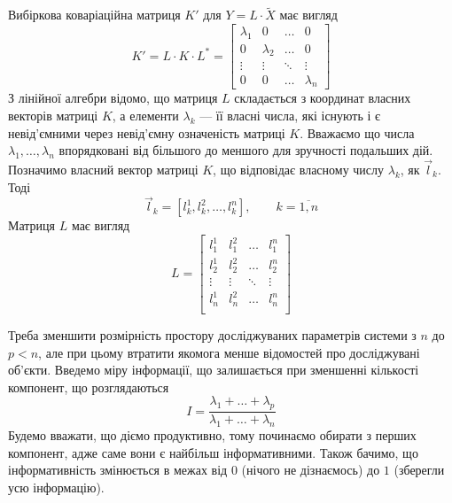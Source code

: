 Вибіркова коваріаційна матриця $K'$ для $Y = L \cdot \tilde{X}$ має вигляд
\begin{equation*}
  K'
  = L \cdot K \cdot L^*
  = \begin{bmatrix}
    \lambda_1 & 0         & \dots  & 0      \\
    0         & \lambda_2 & \dots  & 0      \\
    \vdots    & \vdots    & \ddots & \vdots \\
    0         & 0         & \dots  & \lambda_n
  \end{bmatrix}
\end{equation*}
З лінійної алгебри відомо, що матриця $L$ складається з координат власних
векторів матриці $K$, а елементи $\lambda_k$ --- її власні числа, які
існують і є невід’ємними через невід’ємну означеність матриці $K$.
Вважаємо що числа $\lambda_1, \dots, \lambda_n$ впорядковані від більшого до
меншого для зручності подальших дій.
Позначимо власний вектор матриці $K$, що відповідає власному числу $\lambda_k$,
як $\vec{l}_k$. Тоді
\begin{equation*}
  \vec{l}_k
  = \left[ l_k^1, l_k^2, \dots, l_k^n \right],
  \qquad k = \overline{1,n}
\end{equation*}
Матриця $L$ має вигляд
\begin{equation*}
  L = \begin{bmatrix}
    l_1^1  & l_1^2  & \dots  & l_1^n  \\
    l_2^1  & l_2^2  & \dots  & l_2^n  \\
    \vdots & \vdots & \ddots & \vdots \\
    l_n^1  & l_n^2  & \dots  & l_n^n  \\
  \end{bmatrix}
\end{equation*}

Треба зменшити розмірність простору досліджуваних параметрів системи з $n$ до
$p<n$, але при цьому втратити якомога менше відомостей про досліджувані
об’єкти.
Введемо міру інформації, що залишається при зменшенні кількості компонент, що
розглядаються
\begin{equation*}
  I = \frac{\lambda_1 + \dots + \lambda_p}{\lambda_1 + \dots + \lambda_n}
\end{equation*}
Будемо вважати, що діємо продуктивно, тому починаємо обирати з перших
компонент, адже саме вони є найбільш інформативними.
Також бачимо, що інформативність змінюється в межах від $0$
(нічого не дізнаємось) до $1$ (зберегли усю інформацію).


